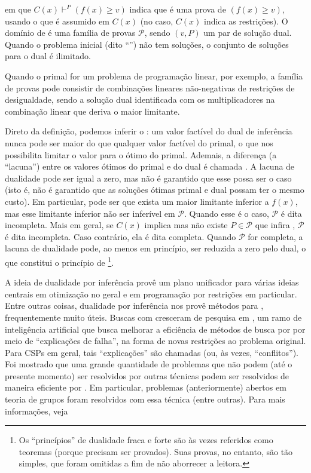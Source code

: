 \documentclass{article}
\begin{document}
\noindent em que $C(x) \vdash^{P} (f(x) \geq v)$ indica que  é uma prova de $(f(x) \geq v)$,
usando o que é assumido em $C(x)$ (no caso, $C(x)$ indica as restrições). O domínio de  é uma família de provas $\mathcal{P}$, sendo
$(v,P)$ um par de solução dual. Quando o problema inicial (dito ``'') não tem
soluções, o conjunto de soluções para o dual é ilimitado.

Quando o primal for um problema de programação linear, por exemplo, a família de provas pode
consistir de combinações lineares não-negativas de restrições de desigualdade, sendo a solução dual
identificada com os multiplicadores na combinação linear que deriva o maior limitante.

Direto da definição, podemos inferir o : um valor factível
 do dual de inferência nunca pode ser maior do que qualquer valor factível do primal, o que
nos possibilita limitar o valor para o ótimo do primal.
Ademais, a diferença (a ``lacuna'') entre os valores ótimos do primal e do dual é chamada
. A lacuna de dualidade pode ser igual a zero, mas não é garantido
que esse possa ser o caso (isto é, não é garantido que as soluções ótimas primal e dual possam ter o
mesmo custo). Em particular, pode ser que exista um maior limitante inferior a $f(x)$, mas
esse limitante inferior não ser inferível em $\mathcal{P}$. Quando esse é o caso, $\mathcal{P}$ é
dita incompleta. Mais em geral, se $C(x)$ implica  mas não existe $P \in
\mathcal{P}$ que infira , $\mathcal{P}$ é dita incompleta. Caso contrário, ela é dita
completa. Quando $\mathcal{P}$ for completa, a lacuna de dualidade pode, ao menos em princípio, ser
reduzida a zero pelo dual, o que
constitui o princípio de \footnote{Os ``princípios'' de dualidade fraca e
  forte são às vezes referidos como teoremas (porque precisam ser provados). Suas provas, no
  entanto, são tão simples, que foram omitidas a fim de não aborrecer a leitora.}.

A ideia de dualidade por inferência provê um plano unificador para várias ideias centrais em
otimização no geral e em programação por restrições em particular. Entre outras coisas, dualidade
por inferência nos provê métodos para , frequentemente muito
úteis. Buscas com  cresceram de pesquisa em
, um ramo de inteligência artificial que busca melhorar
a eficiência de métodos de busca por  por meio de ``explicações de falha'',
na forma de novas restrições ao problema original. Para CSPs em geral, tais ``explicações'' são
chamadas  (ou, às vezes, ``conflitos''). Foi mostrado que uma grande quantidade de
problemas que não podem (até o presente momento) ser resolvidos por outras técnicas podem ser
resolvidos de maneira eficiente por . Em particular, problemas
(anteriormente) abertos em teoria de grupos foram resolvidos com essa técnica (entre outras). Para
mais informações, veja~\cite{beame}
\end{document}

